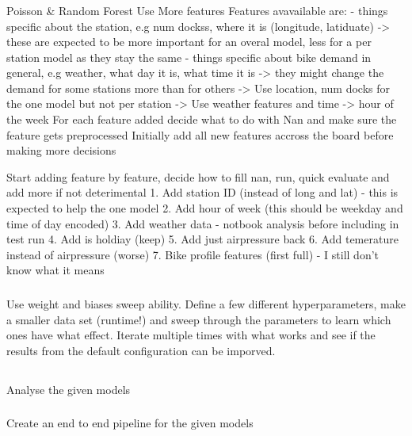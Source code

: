 \documentclass[a4paper]{article}
\begin{document}
    \subsubsection*{}
    Poisson & Random Forest Use More features
    Features avavailable are:
    - things specific about the station, e.g num dockss, where it is (longitude, latiduate) -> these are expected to be more important
    for an overal model, less for a per station model as they stay the same
    - things specific about bike demand in general, e.g weather, what day it is, what time it is -> they might change the demand
    for some stations more than for others
    -> Use location, num docks for the one model but not per station
    -> Use weather features and time  -> hour of the week
    For each feature added decide what to do with Nan and make sure the feature gets preprocessed
    Initially add all new features accross the board before making more decisions

    Start adding feature by feature, decide how to fill nan, run, quick evaluate and add more if not deterimental
    1. Add station ID (instead of long and lat) - this is expected to help the one model
    2. Add hour of week (this should be weekday and time of day encoded)
    3. Add weather data - notbook analysis before including in test run
    4. Add is holdiay (keep)
    5. Add just airpressure back
    6. Add temerature instead of airpressure (worse)
    7. Bike profile features (first full) - I still don't know what it means

    \subsubsection*{}
    Use weight and biases sweep ability. Define a few different hyperparameters, make a smaller data set (runtime!) and
    sweep through the parameters to learn which ones have what effect. Iterate multiple times with what works and
    see if the results from the default configuration can be imporved.

    \subsection*{}
    \subsubsection*{} Analyse the given models
    \subsubsection*{} Create an end to end pipeline for the given models
\end{document}
